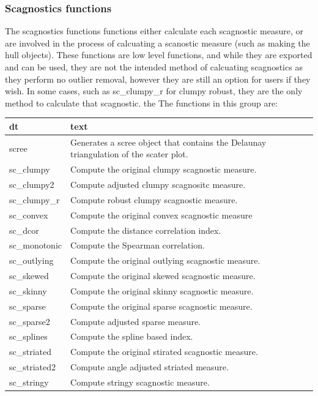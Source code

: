 \hypertarget{scagnostics-functions}{%
\subsubsection{Scagnostics functions}\label{scagnostics-functions}}

The scagnostics functions functions either calculate each scagnostic
measure, or are involved in the process of calcuating a scanostic
measure (such as making the hull objects). These functions are low level
functions, and while they are exported and can be used, they are not the
intended method of calcuating scagnostics as they perform no outlier
removal, however they are still an option for users if they wish. In
some cases, such as sc\_clumpy\_r for clumpy robust, they are the only
method to calculate that scagnostic. the The functions in this group
are:

\begin{Schunk}

\begin{tabular}{l|l}
\hline
dt & text\\
\hline
scree & Generates a scree object that contains the Delaunay triangulation of the scater plot.\\
\hline
sc\_clumpy & Compute the original clumpy scagnostic measure.\\
\hline
sc\_clumpy2 & Compute adjusted clumpy scagnositc measure.\\
\hline
sc\_clumpy\_r & Compute robust clumpy scagnostic measure.\\
\hline
sc\_convex & Compute the original convex scagnostic measure\\
\hline
sc\_dcor & Compute the distance correlation index.\\
\hline
sc\_monotonic & Compute the Spearman correlation.\\
\hline
sc\_outlying & Compute the original outlying scagnostic measure.\\
\hline
sc\_skewed & Compute the original skewed scagnostic measure.\\
\hline
sc\_skinny & Compute the original skinny scagnostic measure.\\
\hline
sc\_sparse & Compute the original sparse scagnostic measure.\\
\hline
sc\_sparse2 & Compute adjusted sparse measure.\\
\hline
sc\_splines & Compute the spline based index.\\
\hline
sc\_striated & Compute the original stirated scagnostic measure.\\
\hline
sc\_striated2 & Compute angle adjusted striated measure.\\
\hline
sc\_stringy & Compute stringy scagnostic measure.\\
\hline
\end{tabular}

\end{Schunk}

